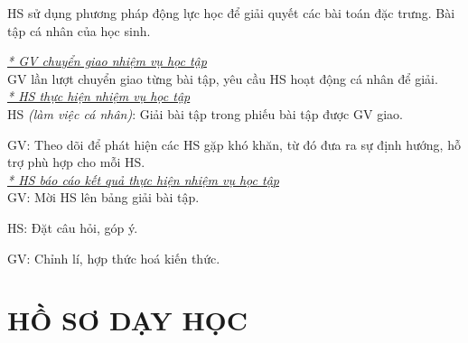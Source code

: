 {
HS sử dụng phương pháp động lực học để giải quyết các bài toán đặc trưng.
}
{
	Bài tập cá nhân của học sinh.
}
{
	\textit{\underline{* GV chuyển giao nhiệm vụ học tập}}\\
	GV lần lượt chuyển giao từng bài tập, yêu cầu HS hoạt động cá nhân để giải.\\
	\textit{\underline{* HS thực hiện nhiệm vụ học tập}}\\
	HS \textit{(làm việc cá nhân)}:  Giải bài tập trong phiếu bài tập được GV giao. 
	
	GV: Theo dõi để phát hiện các HS gặp khó khăn, từ đó đưa ra sự định hướng, hỗ trợ phù hợp cho mỗi HS.\\
	\textit{\underline{* HS báo cáo kết quả thực hiện nhiệm vụ học tập}}\\
	GV: Mời HS lên bảng giải bài tập.
	
	HS: Đặt câu hỏi, góp ý.
	
	GV: Chỉnh lí, hợp thức hoá kiến thức.
}
\section{HỒ SƠ DẠY HỌC}
